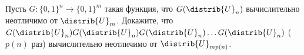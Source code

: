 Пусть $G\colon \{0, 1\}^{n} \rightarrow \{0, 1\}^{m}$ такая функция, что $G(\distrib{U}_n)$ вычислительно
неотличимо от $\distrib{U}_m$. Докажите, что $G(\distrib{U}_n)G(\distrib{U}_n)G(\distrib{U}_n) \dots
G(\distrib{U}_n)$ ($p(n)$ раз) вычислительно неотличимо от $\distrib{U}_{m p(n)}$.